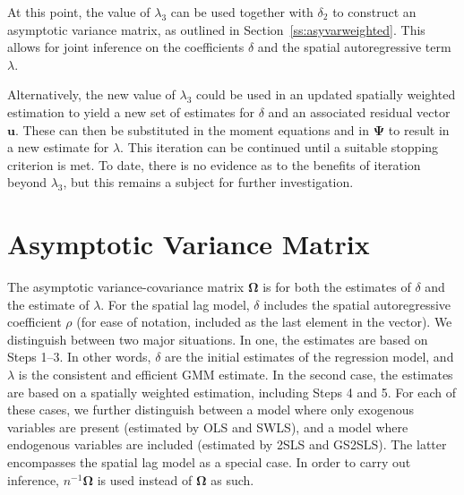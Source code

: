 \documentclass{article}
\begin{document}
At this point, the value of $\lambda_3$ can be used together with $\delta_2$
to construct an asymptotic variance matrix, as outlined in Section~\ref{ss:asyvarweighted}.
This allows for joint inference on the coefficients $\delta$ and the spatial autoregressive
term $\lambda$.

Alternatively, the new value of $\lambda_3$ could be used in an updated spatially
weighted estimation to yield a new set of estimates for $\delta$ and an associated
residual vector $\mathbf{u}$. These can then be substituted in the moment equations
and in $\mathbf{\Psi}$ to result in a new estimate for $\lambda$. This iteration can be continued
until a suitable stopping criterion is met. To date, there is no evidence as to the 
benefits of iteration beyond $\lambda_3$, but this remains a subject for further investigation.

\section{Asymptotic Variance Matrix}
The asymptotic variance-covariance matrix $\mathbf{\Omega}$ is for both the estimates of $\delta$ and the
estimate of $\lambda$. For the spatial lag model, $\delta$ includes the spatial
autoregressive coefficient $\rho$ (for ease of notation, included as the last element 
in the vector). We distinguish between two major situations. In one, the estimates are
based on Steps 1--3. In other words, $\delta$ are the initial estimates of the regression
model, and $\lambda$ is the consistent and efficient GMM estimate. In the second
case, the estimates are based on a spatially weighted estimation, including 
Steps 4 and 5. For each of these cases, we further distinguish between a model
where only exogenous variables are present (estimated by OLS and SWLS), and
a model where endogenous variables are included (estimated by 2SLS and
GS2SLS). The latter encompasses the spatial lag model as a special case.
In order to carry out inference, $n^{-1} \mathbf{\Omega}$ is used instead of
 $\mathbf{\Omega}$ as such.
\end{document}
